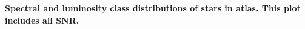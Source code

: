 {\bf  Spectral and luminosity class distributions of stars in atlas. This plot includes all SNR.\label{fig:hiso-spt-type}}